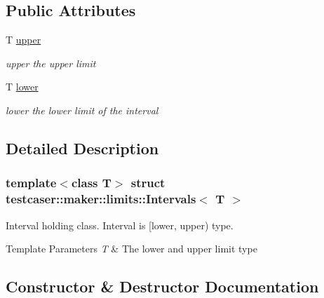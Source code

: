 \subsection*{Public Attributes}
\begin{DoxyCompactItemize}
\item 
T \mbox{\hyperlink{structtestcaser_1_1maker_1_1limits_1_1Intervals_ae8f8bf8607c83b429729bd36e74699dd}{upper}}
\begin{DoxyCompactList}\small\item\em upper the upper limit \end{DoxyCompactList}\item 
T \mbox{\hyperlink{structtestcaser_1_1maker_1_1limits_1_1Intervals_a51f277024599c24b6bfdffe1276f236d}{lower}}
\begin{DoxyCompactList}\small\item\em lower the lower limit of the interval \end{DoxyCompactList}\end{DoxyCompactItemize}


\subsection{Detailed Description}
\subsubsection*{template$<$class T$>$\newline
struct testcaser\+::maker\+::limits\+::\+Intervals$<$ T $>$}

Interval holding class. Interval is \mbox{[}lower, upper) type. 


\begin{DoxyTemplParams}{Template Parameters}
{\em T} & The lower and upper limit type \\
\hline
\end{DoxyTemplParams}


\subsection{Constructor \& Destructor Documentation}
\mbox{\label{structtestcaser_1_1maker_1_1limits_1_1Intervals_a69fe886908002aa20f41ed886fc213ef}} 
